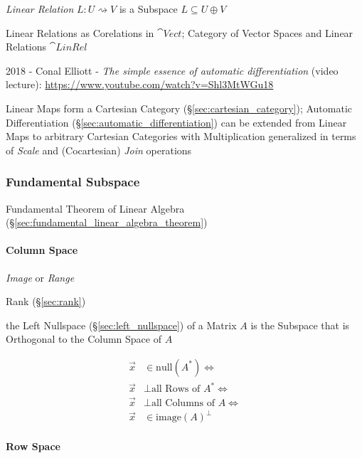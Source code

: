 \emph{Linear Relation} $L : U \rightsquigarrow V$ is a Subspace $L
\subseteq U \oplus V$

Linear Relations as Corelations in $\cat{Vect}$; Category of Vector
Spaces and Linear Relations $\cat{LinRel}$

2018 - Conal Elliott - \emph{The simple essence of automatic differentiation}
(video lecture): \url{https://www.youtube.com/watch?v=Shl3MtWGu18}

Linear Maps form a Cartesian Category (\S\ref{sec:cartesian_category});
Automatic Differentiation (\S\ref{sec:automatic_differentiation}) can be
extended from Linear Maps to arbitrary Cartesian Categories with Multiplication
generalized in terms of \emph{Scale} and (Cocartesian) \emph{Join} operations



\subsubsection{Fundamental Subspace}\label{sec:fundamental_subspace}

\fist Fundamental Theorem of Linear Algebra
(\S\ref{sec:fundamental_linear_algebra_theorem})



\paragraph{Column Space}\label{sec:column_space}\hfill

\emph{Image} or \emph{Range}

Rank (\S\ref{sec:rank})

the Left Nullspace (\S\ref{sec:left_nullspace}) of a Matrix $A$ is the Subspace
that is Orthogonal to the Column Space of $A$

\begin{align*}
  \vec{x} & \in \mathrm{null}(A^*) \Leftrightarrow         \\
  \vec{x} & \bot \text{all Rows of }A^* \Leftrightarrow    \\
  \vec{x} & \bot \text{all Columns of }A \Leftrightarrow   \\
  \vec{x} & \in \mathrm{image}(A)^\bot
\end{align*}



\paragraph{Row Space}\label{sec:row_space}\hfill

